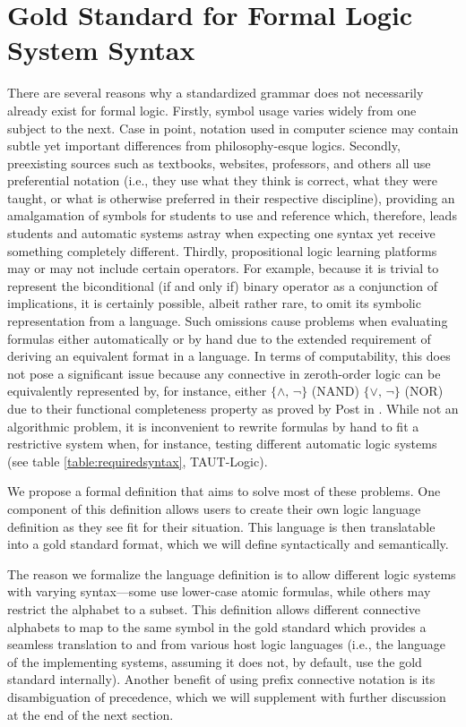 \documentclass[ms]{uncgdissertationexp2}
\theoremstyle{plain}
\theoremstyle{definition}
\theoremstyle{remark}
\begin{document}
\section{Gold Standard for Formal Logic System Syntax}
There are several reasons why a standardized grammar does not necessarily already exist for formal logic. Firstly, symbol usage varies widely from one subject to the next. Case in point, notation used in computer science may contain subtle yet important differences from philosophy-esque logics. Secondly, preexisting sources such as textbooks, websites, professors, and others all use preferential notation (i.e., they use what they think is correct, what they were taught, or what is otherwise preferred in their respective discipline), providing an amalgamation of symbols for students to use and reference which, therefore, leads students and automatic systems astray when expecting one syntax yet receive something completely different. Thirdly, propositional logic learning platforms may or may not include certain operators. For example, because it is trivial to represent the biconditional (if and only if) binary operator as a conjunction of implications, it is certainly possible, albeit rather rare, to omit its symbolic representation from a language. Such omissions cause problems when evaluating formulas either automatically or by hand due to the extended requirement of deriving an equivalent format in a language. In terms of computability, this does not pose a significant issue because any connective in zeroth-order logic can be equivalently represented by, for instance, either $\{\land,\,\lnot\}$ (NAND) $\{\lor,\,\lnot\}$ (NOR) due to their functional completeness property as proved by Post in \cite{post}. While not an algorithmic problem, it is inconvenient to rewrite formulas by hand to fit a restrictive system when, for instance, testing different automatic logic systems (see table \ref{table:requiredsyntax}, TAUT-Logic).

We propose a formal definition that aims to solve most of these problems. One component of this definition allows users to create their own logic language definition as they see fit for their situation. This language is then translatable into a gold standard format, which we will define syntactically and semantically.

The reason we formalize the language definition is to allow different logic systems with varying syntax---some use lower-case atomic formulas, while others may restrict the alphabet to a subset. This definition allows different connective alphabets to map to the same symbol in the gold standard which provides a seamless translation to and from various host logic languages (i.e., the language of the implementing systems, assuming it does not, by default, use the gold standard internally). Another benefit of using prefix connective notation is its disambiguation of precedence, which we will supplement with further discussion at the end of the next section.
\end{document}
